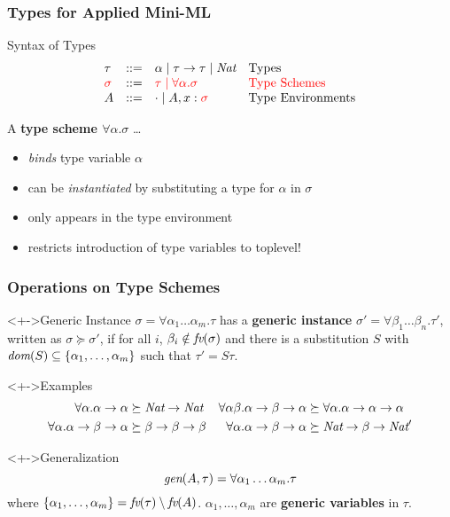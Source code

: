 \documentclass[pdftex,aspectratio=169]{beamer}
\begin{document}
\begin{frame}
  \frametitle{Types for Applied Mini-ML}
  \begin{block}{Syntax of Types}
    \begin{displaymath}
      \begin{array}{lcll}
        \tau & ::= & \alpha \mid \tau \to \tau \mid \textit{Nat} &
        \textrm{Types}\\\color{red}
        \sigma & ::= & \color{red} \tau \mid \forall \alpha. \sigma & 
        \color{red}\textrm{Type Schemes}\\
        A & ::= & \cdot \mid A, x:\color{red}\sigma &
        \textrm{Type Environments}
      \end{array}
    \end{displaymath}
  \end{block}
  A \textbf{type scheme  $\forall\alpha.\sigma$} \dots
  \begin{itemize}
  \item \emph{binds} type variable $\alpha$
  \item can be \emph{instantiated} by substituting a type for $\alpha$
    in $\sigma$
  \item only appears in the type environment
  \item restricts introduction of type variables to toplevel!
  \end{itemize}
\end{frame}

\begin{frame}
  \frametitle{Operations on Type Schemes}
  \begin{block}<+->{Generic Instance}
    $\sigma = \forall\alpha_1\dots\alpha_m.\tau$ has a \textbf{generic
      instance}
    $\sigma' = \forall\beta_1\dots\beta_n.\tau'$, written as 
    $\sigma \succeq \sigma'$, if for all $i$, $\beta_i\notin
    \textit{fv} (\sigma)$ and there is a substitution $S$ with
    $\textit{dom} (S) \subseteq \{\alpha_1,\dots,\alpha_m\}$ such that $\tau' = S\tau$.
  \end{block}
  \begin{exampleblock}<+->{Examples}\VSPBLS
    \begin{align*}
      \forall\alpha.\alpha\to\alpha &\succeq \textit{Nat}\to\textit{Nat}
      &
        \forall\alpha\beta.\alpha\to\beta\to\alpha
      & \succeq \forall \alpha. \alpha\to\alpha\to \alpha
      \\
      \forall\alpha.\alpha\to\beta\to\alpha & \succeq \beta\to\beta\to\beta
      &
      \forall\alpha.\alpha\to\beta\to\alpha & \succeq \textit{Nat}\to\beta\to\textit{Nat}'
    \end{align*}
  \end{exampleblock}
  \begin{block}<+->{Generalization}
    \begin{displaymath}
      \textit{gen} (A , \tau ) = \forall \alpha_1 \dots \alpha_m. \tau
    \end{displaymath}
    where $\{ \alpha_1,\dots, \alpha_m \} = \textit{fv} (\tau) \setminus \textit{fv} (A)$.
    \qquad
    $\alpha_1,\dots,\alpha_m$ are \textbf{generic variables} in $\tau$.
  \end{block}
\end{frame}
\end{document}
